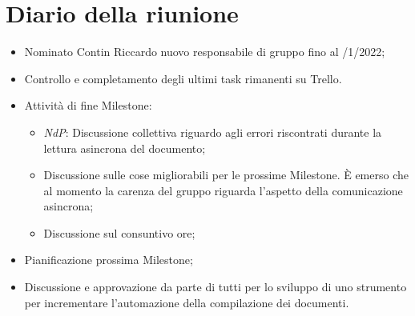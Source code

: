 \section{Diario della riunione}
\begin{itemize}
  \item Nominato Contin Riccardo nuovo responsabile di gruppo fino al 
  /1/2022;
  \item Controllo e completamento degli ultimi task rimanenti su Trello.
  \item Attività di fine Milestone:
  \begin{itemize}
    \item \textit{NdP}: Discussione collettiva riguardo agli errori riscontrati durante la lettura asincrona del documento;
    \item Discussione sulle cose migliorabili per le prossime Milestone. \`E emerso che al momento la carenza del gruppo riguarda l'aspetto della comunicazione asincrona;
    \item Discussione sul consuntivo ore;
  \end{itemize}
  \item Pianificazione prossima Milestone;
  \item Discussione e approvazione da parte di tutti per lo sviluppo di uno strumento per incrementare l'automazione della compilazione dei documenti.
\end{itemize}
